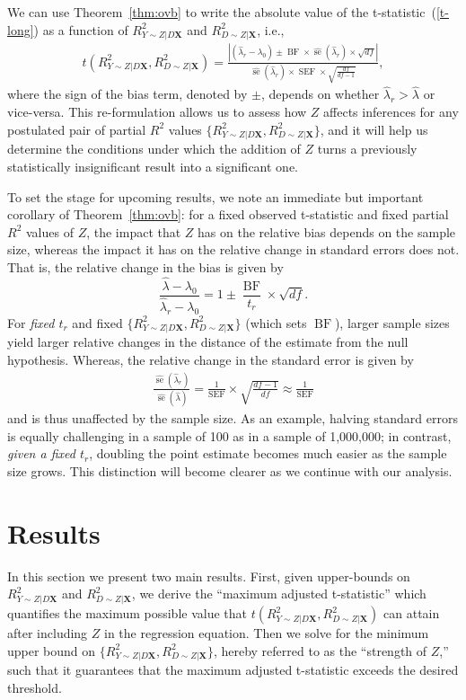 \documentclass[sts]{imsart}
\theoremstyle{plain}
\theoremstyle{definition}
\newcommand{\df}{df}
\DeclareMathOperator{\se}{\text{se}}
\DeclareMathOperator{\SEF}{\text{SEF}}
\DeclareMathOperator{\BF}{\text{BF}}
\newcommand{\Ry}{R^2_{Y\sim Z | D\mathbf{X}}}
\newcommand{\Rd}{R^2_{D\sim Z | \mathbf{X}}}
\begin{document}
We can use Theorem~\ref{thm:ovb}  to write the absolute value of the t-statistic~(\ref{t-long}) as a function of $\Ry$ and $\Rd$, i.e.,
%
\begin{align}\label{eq:abs_tstat}
        {\textstyle t(\Ry, \Rd)= 
        \frac{|(\hat{\lambda}_{r } - \lambda_0) \pm \BF \times \widehat{\se}(\hat{\lambda}_{r }) \times \sqrt{\df}|}{\widehat{\se}(\hat{\lambda}_{r })\times\SEF\times\sqrt{\frac{\df}{\df-1}}},} 
\end{align}
%
%
where the sign of the bias term, denoted by $\pm$, depends on whether $\hat{\lambda}_r > \hat{\lambda}$ or vice-versa.
This re-formulation allows us to assess how $Z$ affects inferences for any postulated pair of partial $R^2$ values $\{\Ry, \Rd\}$, and it will help us determine the conditions under which the addition of $Z$ turns a previously statistically insignificant result into a significant one. 


To set the stage for upcoming results, we note an immediate but important corollary of Theorem~\ref{thm:ovb}:
for a fixed observed t-statistic and fixed partial $R^2$ values of $Z$, the impact that $Z$ has on the relative bias depends on the sample size, whereas the impact it has on the relative change in standard errors does not. 
That is, the relative change in the bias is given by
$$
\frac{\hat{\lambda} - \lambda_0}{\hat{\lambda}_r-\lambda_0} = 1 \pm \frac{\BF}{t_r} \times \sqrt{\df}.
$$
For \emph{fixed $t_r$} and fixed $\{\Ry, \Rd\}$ (which sets $\BF$), 
larger sample sizes yield larger relative changes in the distance of the estimate from the null hypothesis.  Whereas, the relative change in the standard error is given by
\begin{align}
\frac{\widehat{\se}(\hat{\lambda}_r)}{\widehat{\se}(\hat{\lambda})}= \frac{1}{\SEF}\times \sqrt{\frac{\df-1}{\df}} \approx \frac{1}{\SEF}
\end{align}
and is thus unaffected by the sample size. As an example, 
halving standard errors is equally challenging in a sample of 100 as in a sample of 1,000,000; in contrast, \emph{given a fixed $t_r$}, doubling the point estimate becomes much easier as the sample size grows. This distinction will become clearer as we continue with our analysis.

\section{Results}

In this section we present two main results.
First, given upper-bounds on $\Ry$ and $\Rd$, we derive the ``maximum adjusted t-statistic'' which quantifies the maximum possible value that $t(\Ry, \Rd)$ can attain after including $Z$ in the regression equation. Then we solve for the minimum upper bound on $\{\Ry, \Rd\}$, hereby referred to as the ``strength of $Z$,''  such that it guarantees that the maximum adjusted t-statistic exceeds the desired threshold. 
\end{document}
